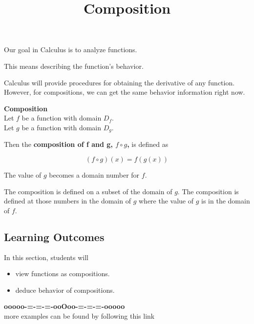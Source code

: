 \documentclass{ximera}
\title{Composition}
\begin{document}
\begin{abstract}
%
\end{abstract}
\maketitle








Our goal in Calculus is to analyze functions.


This means describing the function's behavior.

Calculus will provide procedures for obtaining the derivative of any function.  However, for compositions, we can get the same behavior information right now.






\begin{template} \textbf{\textcolor{blue!55!black}{Composition}}  \\


Let $f$ be a function with domain $D_f$. \\


Let $g$ be a function with domain $D_g$.




Then the \textbf{\textcolor{green!50!black}{composition of f and g, $f \circ g$,}} is defined as

\[
(f \circ g)(x) = f(g(x))
\] 


The value of $g$ becomes a domain number for $f$.


The composition is defined on a subset of the domain of $g$.  The composition is defined at those numbers in the domain of $g$ where the value of $g$ is in the domain of $f$.




\end{template}








\subsection*{Learning Outcomes}


\begin{sectionOutcomes}
In this section, students will 

\begin{itemize}
\item view functions as compositions.
\item deduce behavior of compositions.
\end{itemize}
\end{sectionOutcomes}












\begin{center}
\textbf{\textcolor{green!50!black}{ooooo-=-=-=-ooOoo-=-=-=-ooooo}} \\

more examples can be found by following this link\\ 

\end{center}
\end{document}
